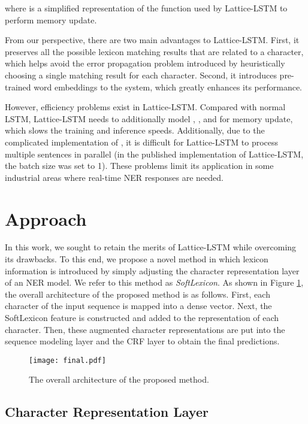 \documentclass[11pt,a4paper]{article}
\begin{document}
\begin{CJK}{UTF8}{gbsn}
where  is a simplified representation of the function used by Lattice-LSTM to perform memory update. 


From our perspective, there are two main advantages to Lattice-LSTM. First, it preserves all the possible lexicon matching results that are related to a character, which helps avoid the error propagation problem introduced by heuristically choosing a single matching result for each character. Second, it introduces pre-trained word embeddings to the system, which greatly enhances its performance. 


However, efficiency problems exist in Lattice-LSTM. Compared with normal LSTM, Lattice-LSTM needs to additionally model , , and  for memory update, which slows the training and inference speeds. Additionally, due to the complicated implementation of , it is difficult for Lattice-LSTM to process multiple sentences in parallel (in the published implementation of Lattice-LSTM, the batch size was set to 1). These problems limit its application in some industrial areas where real-time NER responses are needed.  





\section{Approach}
In this work, we sought to retain the merits of Lattice-LSTM while overcoming its drawbacks.
To this end, we propose a novel method in which lexicon information is introduced by simply adjusting the character representation layer of an NER model. We refer to this method as \textit{SoftLexicon}. As shown in Figure \ref{fig:model_figure}, the overall architecture of the proposed method is as follows. First, each character of the input sequence is mapped into a dense vector. Next, the SoftLexicon feature is constructed and added to the representation of each character.
Then, these augmented character representations are put into the sequence modeling layer and the CRF layer to obtain the final predictions.


\begin{figure}
\centering
\texttt{[image: final.pdf]}
\caption{The overall architecture of the proposed method.}
\label{fig:model_figure}
\end{figure}

\subsection{Character Representation Layer}


\end{CJK}
\end{document}
